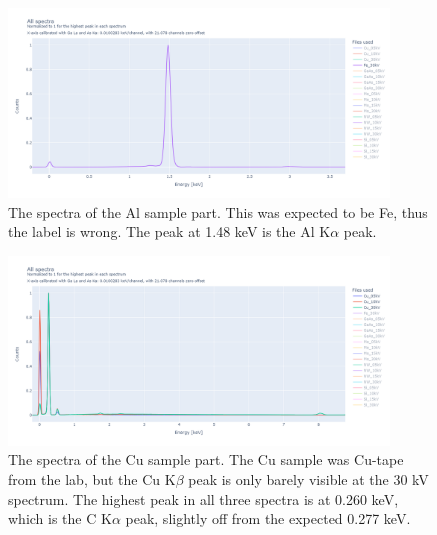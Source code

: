 
\begin{figure}
    \centering
    \includegraphics[width=0.90\textwidth]{figures/Spectra_Al.png}
    \caption{
        The spectra of the Al sample part.
        This was expected to be Fe, thus the label is wrong.
        The peak at 1.48 keV is the Al K$\alpha$ peak.
    }
    \label{fig:results:Spectra_Al}
\end{figure}

\begin{figure}
    \centering
    \includegraphics[width=0.90\textwidth]{figures/Spectra_Cu.png}
    \caption{
        The spectra of the Cu sample part.
        The Cu sample was Cu-tape from the lab, but the Cu K$\beta$ peak is only barely visible at the 30 kV spectrum.
        The highest peak in all three spectra is at 0.260 keV, which is the C K$\alpha$ peak, slightly off from the expected 0.277 keV.
    }
    \label{fig:results:Spectra_Cu}
\end{figure}

